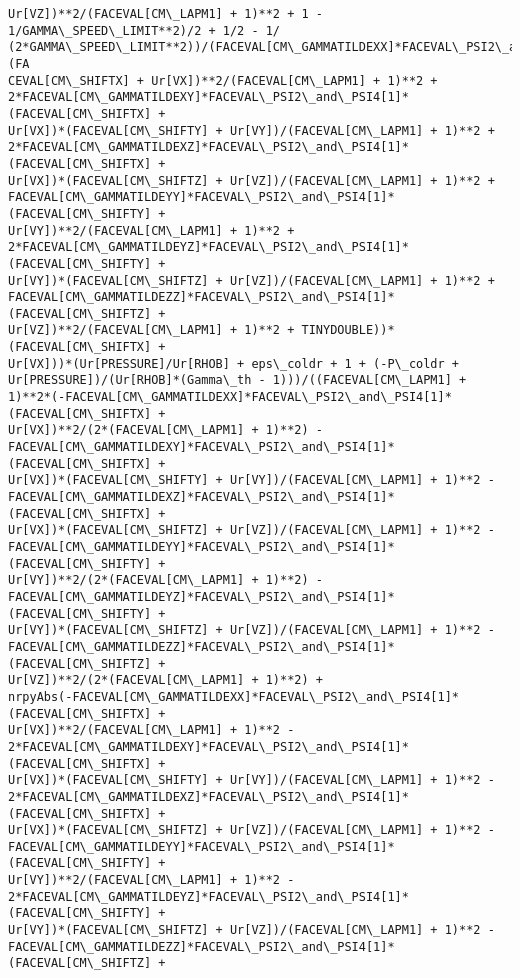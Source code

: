 \documentclass[landscape,letterpaper,10pt,english]{article}
\begin{document}
\begin{Verbatim}[commandchars=\\\{\}]
Ur[VZ])**2/(FACEVAL[CM\_LAPM1] + 1)**2 + 1 - 1/GAMMA\_SPEED\_LIMIT**2)/2 + 1/2 - 1/
(2*GAMMA\_SPEED\_LIMIT**2))/(FACEVAL[CM\_GAMMATILDEXX]*FACEVAL\_PSI2\_and\_PSI4[1]*(FA
CEVAL[CM\_SHIFTX] + Ur[VX])**2/(FACEVAL[CM\_LAPM1] + 1)**2 +
2*FACEVAL[CM\_GAMMATILDEXY]*FACEVAL\_PSI2\_and\_PSI4[1]*(FACEVAL[CM\_SHIFTX] +
Ur[VX])*(FACEVAL[CM\_SHIFTY] + Ur[VY])/(FACEVAL[CM\_LAPM1] + 1)**2 +
2*FACEVAL[CM\_GAMMATILDEXZ]*FACEVAL\_PSI2\_and\_PSI4[1]*(FACEVAL[CM\_SHIFTX] +
Ur[VX])*(FACEVAL[CM\_SHIFTZ] + Ur[VZ])/(FACEVAL[CM\_LAPM1] + 1)**2 +
FACEVAL[CM\_GAMMATILDEYY]*FACEVAL\_PSI2\_and\_PSI4[1]*(FACEVAL[CM\_SHIFTY] +
Ur[VY])**2/(FACEVAL[CM\_LAPM1] + 1)**2 +
2*FACEVAL[CM\_GAMMATILDEYZ]*FACEVAL\_PSI2\_and\_PSI4[1]*(FACEVAL[CM\_SHIFTY] +
Ur[VY])*(FACEVAL[CM\_SHIFTZ] + Ur[VZ])/(FACEVAL[CM\_LAPM1] + 1)**2 +
FACEVAL[CM\_GAMMATILDEZZ]*FACEVAL\_PSI2\_and\_PSI4[1]*(FACEVAL[CM\_SHIFTZ] +
Ur[VZ])**2/(FACEVAL[CM\_LAPM1] + 1)**2 + TINYDOUBLE))*(FACEVAL[CM\_SHIFTX] +
Ur[VX]))*(Ur[PRESSURE]/Ur[RHOB] + eps\_coldr + 1 + (-P\_coldr +
Ur[PRESSURE])/(Ur[RHOB]*(Gamma\_th - 1)))/((FACEVAL[CM\_LAPM1] +
1)**2*(-FACEVAL[CM\_GAMMATILDEXX]*FACEVAL\_PSI2\_and\_PSI4[1]*(FACEVAL[CM\_SHIFTX] +
Ur[VX])**2/(2*(FACEVAL[CM\_LAPM1] + 1)**2) -
FACEVAL[CM\_GAMMATILDEXY]*FACEVAL\_PSI2\_and\_PSI4[1]*(FACEVAL[CM\_SHIFTX] +
Ur[VX])*(FACEVAL[CM\_SHIFTY] + Ur[VY])/(FACEVAL[CM\_LAPM1] + 1)**2 -
FACEVAL[CM\_GAMMATILDEXZ]*FACEVAL\_PSI2\_and\_PSI4[1]*(FACEVAL[CM\_SHIFTX] +
Ur[VX])*(FACEVAL[CM\_SHIFTZ] + Ur[VZ])/(FACEVAL[CM\_LAPM1] + 1)**2 -
FACEVAL[CM\_GAMMATILDEYY]*FACEVAL\_PSI2\_and\_PSI4[1]*(FACEVAL[CM\_SHIFTY] +
Ur[VY])**2/(2*(FACEVAL[CM\_LAPM1] + 1)**2) -
FACEVAL[CM\_GAMMATILDEYZ]*FACEVAL\_PSI2\_and\_PSI4[1]*(FACEVAL[CM\_SHIFTY] +
Ur[VY])*(FACEVAL[CM\_SHIFTZ] + Ur[VZ])/(FACEVAL[CM\_LAPM1] + 1)**2 -
FACEVAL[CM\_GAMMATILDEZZ]*FACEVAL\_PSI2\_and\_PSI4[1]*(FACEVAL[CM\_SHIFTZ] +
Ur[VZ])**2/(2*(FACEVAL[CM\_LAPM1] + 1)**2) +
nrpyAbs(-FACEVAL[CM\_GAMMATILDEXX]*FACEVAL\_PSI2\_and\_PSI4[1]*(FACEVAL[CM\_SHIFTX] +
Ur[VX])**2/(FACEVAL[CM\_LAPM1] + 1)**2 -
2*FACEVAL[CM\_GAMMATILDEXY]*FACEVAL\_PSI2\_and\_PSI4[1]*(FACEVAL[CM\_SHIFTX] +
Ur[VX])*(FACEVAL[CM\_SHIFTY] + Ur[VY])/(FACEVAL[CM\_LAPM1] + 1)**2 -
2*FACEVAL[CM\_GAMMATILDEXZ]*FACEVAL\_PSI2\_and\_PSI4[1]*(FACEVAL[CM\_SHIFTX] +
Ur[VX])*(FACEVAL[CM\_SHIFTZ] + Ur[VZ])/(FACEVAL[CM\_LAPM1] + 1)**2 -
FACEVAL[CM\_GAMMATILDEYY]*FACEVAL\_PSI2\_and\_PSI4[1]*(FACEVAL[CM\_SHIFTY] +
Ur[VY])**2/(FACEVAL[CM\_LAPM1] + 1)**2 -
2*FACEVAL[CM\_GAMMATILDEYZ]*FACEVAL\_PSI2\_and\_PSI4[1]*(FACEVAL[CM\_SHIFTY] +
Ur[VY])*(FACEVAL[CM\_SHIFTZ] + Ur[VZ])/(FACEVAL[CM\_LAPM1] + 1)**2 -
FACEVAL[CM\_GAMMATILDEZZ]*FACEVAL\_PSI2\_and\_PSI4[1]*(FACEVAL[CM\_SHIFTZ] +

\end{Verbatim}
\end{document}
